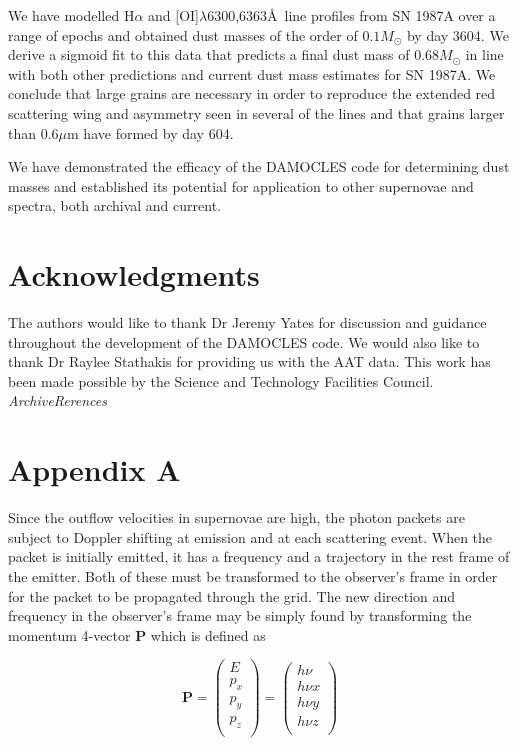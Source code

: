 \documentclass[useAMS,usenatbib,usegraphicx]{mnras}
\begin{document}
We have modelled H$\alpha$ and [OI]$\lambda$6300,6363\AA\ line profiles from SN 1987A over a range of epochs and obtained dust masses of the order of $0.1M_{\odot}$ by day 3604.  We derive a sigmoid fit to this data that predicts a final dust mass of 0.68$M_{\odot}$ in line with both other predictions and current dust mass estimates for SN 1987A.  We conclude that large grains are necessary in order to reproduce the extended red scattering wing and asymmetry seen in several of the lines and that grains larger than $0.6\mu$m have formed by day 604.

We have demonstrated the efficacy of the DAMOCLES code for determining dust masses and established its potential for application to other supernovae and spectra, both archival and current. 


\section*{Acknowledgments}

The authors would like to thank Dr Jeremy Yates for discussion and guidance throughout the development of the DAMOCLES code.  We would also like to thank Dr Raylee Stathakis for providing us with the AAT data.  This work has been made possible by the Science and Technology Facilities Council.  \textit{ArchiveRerences}

{}


\appendix

\section[]{Appendix A}
Since the outflow velocities in supernovae are high, the photon packets are subject to Doppler shifting at emission and at each scattering event.  When the packet is initially emitted, it has a frequency and a trajectory in the rest frame of the emitter. Both of these must be transformed to the observer's frame in order for the packet to be propagated through the grid.  The new direction and frequency in the observer's frame may be simply found by transforming the momentum 4-vector $\mathbf{P}$ which is defined as

\begin{equation}
\mathbf{P}=
\begin{pmatrix}
	E \\
	p_x \\
	p_y \\
	p_z \\
	\end{pmatrix} =
	\begin{pmatrix}
	h \nu \\
	h \nu x \\
	h \nu y \\
	h \nu z \\
	\end{pmatrix}
\end{equation}
\end{document}
